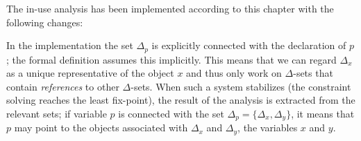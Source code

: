 \begin{docpart}
The in-use analysis has been implemented according to this chapter with the
following changes:

In the implementation the set $\Delta_p$ is explicitly connected with
the declaration of $p$; the formal definition assumes this implicitly.
This means that we can regard $\Delta_x$ as a unique representative of
the object $x$ and thus only work on $\Delta$-sets that contain
\emph{references} to other $\Delta$-sets.  When such a system
stabilizes (\ie the constraint solving reaches the least fix-point),
the result of the analysis is extracted from the relevant sets; \eg if
variable $p$ is connected with the set $\Delta_p =
\{\Delta_x,\Delta_y\}$, it means that $p$ may point to the objects
associated with $\Delta_x$ and $\Delta_y$, \ie the variables $x$ and
$y$.



\end{docpart}

